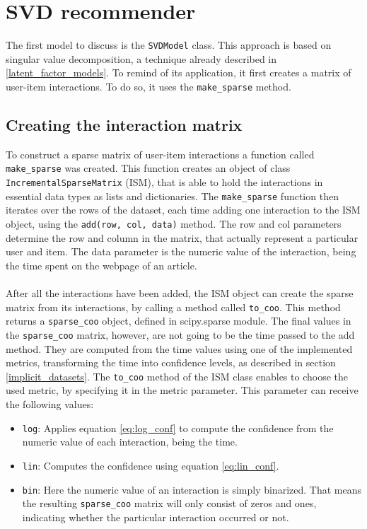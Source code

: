 \section{SVD recommender} \label{svd_implementation}
The first model to discuss is the \texttt{SVDModel} class. This approach is based on singular value decomposition, a technique already described in \ref{latent_factor_models}. To remind of its application, it first creates a matrix of user-item interactions. To do so, it uses the \texttt{make\_sparse} method. 

\subsection*{Creating the interaction matrix}
To construct a sparse matrix of user-item interactions a function called \texttt{make\_sparse} was created. This function creates an object of class \texttt{IncrementalSparseMatrix} (ISM), that is able to hold the interactions in essential data types as lists and dictionaries. The \texttt{make\_sparse} function then iterates over the rows of the dataset, each time adding one interaction to the ISM object, using the \texttt{add(row, col, data)} method. The row and col parameters determine the row and column in the matrix, that actually represent a particular user and item. The data parameter is the numeric value of the interaction, being the time spent on the webpage of an article. \\ \\
After all the interactions have been added, the ISM object can create the sparse matrix from its interactions, by calling a method called \texttt{to\_coo}. This method returns a \texttt{sparse\_coo} object, defined in scipy.sparse module. The final values in the \texttt{sparse\_coo} matrix, however,  are not going to be the time passed to the add method. They are computed from the time values using one of the implemented metrics, transforming the time into confidence levels, as described in section \ref{implicit_datasets}. 
The \texttt{to\_coo} method of the ISM class enables to choose the used metric, by specifying it in the metric parameter. This parameter can receive the following values:
\begin{itemize}
    \item \texttt{log}: Applies equation \ref{eq:log_conf} to compute the confidence from the numeric value of each interaction, being the time.
    \item \texttt{lin}: Computes the confidence using equation \ref{eq:lin_conf}.
    \item \texttt{bin}: Here the numeric value of an interaction is simply binarized. That means the resulting \texttt{sparse\_coo} matrix will only consist of zeros and ones, indicating whether the particular interaction occurred or not.
\end{itemize}
